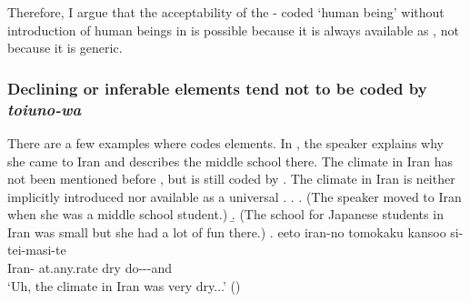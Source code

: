 Therefore,
I argue that the acceptability of the - coded `human being' without introduction of human beings in \LLast is possible
because it is always available as ,
not because it is generic.


\subsubsection{Declining or inferable elements tend not to be coded by \textit{toiuno-wa}}\label{Toiuno-waInfSemiActUnuse}

There are a few examples
where  codes  elements.
In \Next,
the speaker explains why she came to Iran and describes the middle school there.
The climate in Iran has not been mentioned before \Next[c],
but is still coded by .
The climate in Iran is neither implicitly introduced nor available as a universal .
\ex. \label{IranClimate}
 \a. (The speaker moved to Iran when she was a middle school student.)
 \b. (The school for Japanese students in Iran was small but she had a lot of fun there.)
 \bg. eeto iran-no  tomokaku kansoo si-tei-masi-te \\
 	 Iran-  at.any.rate dry do---and \\
	`Uh, the climate in Iran was very dry...'
	\hfill{()}
%

